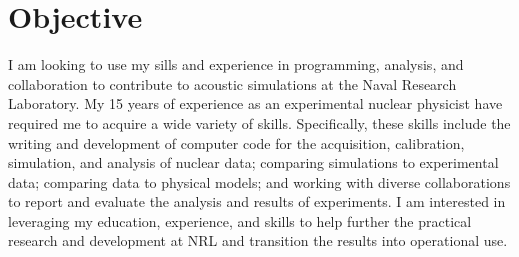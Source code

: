 \clearpage
\pagestyle{fancy}
\lhead{\boldtext{\shortname}}

\begin{changemargin}{\indent}
\nameaddress{\workaddress}%
\end{changemargin}
\renewcommand{\desctext}[1]{#1}%
\renewcommand{\extra}[1]{}

\extra{%
\section*{Personal Information}
\addcontentsline{toc}{section}{Personal Information}
\begin{quote}
  \setlength{\itemsep}{0pt}
  \setlength{\parskip}{0pt}
  \setlength{\parsep}{0pt}
	Born October 7$^{\textrm{th}}$, 1981 in Ann Arbor, Michigan.  U.S. citizen.  Married to Holly Lighthall.
\end{quote}
}
\extra{Not for publication. Superfluous items printed in gray.}

{}
\vspace*{-2\baselineskip}
\section*{Objective}
\begin{changemargin}{15pt}%
I am looking to use my sills and  %
 experience %
in programming,  analysis, and collaboration %
to contribute to acoustic simulations at the Naval Research Laboratory.
 My  15 years of experience  as an experimental 
 nuclear physicist 
have required me to acquire a wide variety of %
skills.
Specifically, these skills include 
the writing and development of computer code for the acquisition, calibration, simulation, and analysis of nuclear %
data;
comparing simulations to experimental data;
comparing data to physical models; 
and working with diverse collaborations to report and evaluate the analysis and results of experiments.
I am interested in leveraging my education, experience, and skills to help further the practical research and development at NRL
and transition the results into operational use.
\end{changemargin}

